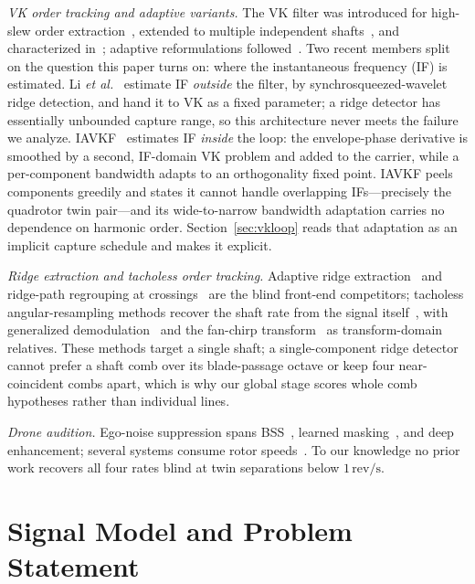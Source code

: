 \documentclass[journal]{IEEEtran}
\newcommand{\revps}{\ensuremath{\,\mathrm{rev/s}}}
\begin{document}
\emph{VK order tracking and adaptive variants.} The VK filter was
introduced for high-slew order extraction~\cite{vold1993high}, extended to
multiple independent shafts~\cite{vold1997multi}, and characterized
in~\cite{herlufsen1999characteristics,tuma2000characteristics}; adaptive
reformulations followed~\cite{pan2007adaptive,pan2010extended}. Two recent
members split on the question this paper turns on: where the instantaneous
frequency (IF) is estimated. Li \emph{et al.}~\cite{li2020vkswt} estimate
IF \emph{outside} the filter, by synchrosqueezed-wavelet ridge detection,
and hand it to VK as a fixed parameter; a ridge detector has essentially
unbounded capture range, so this architecture never meets the failure we
analyze. IAVKF~\cite{jiang2024iavkf} estimates IF \emph{inside} the loop:
the envelope-phase derivative is smoothed by a second, IF-domain VK
problem and added to the carrier, while a per-component bandwidth adapts
to an orthogonality fixed point. IAVKF peels components greedily and
states it cannot handle overlapping IFs---precisely the quadrotor twin
pair---and its wide-to-narrow bandwidth adaptation carries no dependence
on harmonic order. Section~\ref{sec:vkloop} reads that adaptation as an
implicit capture schedule and makes it explicit.

\emph{Ridge extraction and tacholess order tracking.} Adaptive ridge
extraction~\cite{iatsenko2016ridges,aare2023ridge} and ridge-path
regrouping at crossings~\cite{chen2017rprg} are the blind front-end
competitors; tacholess angular-resampling methods recover the shaft rate
from the signal itself~\cite{peeters2019tacholess,wang2019tlot}, with
generalized demodulation~\cite{olhede2005generalized} and the fan-chirp
transform~\cite{weruaga2007fanchirp} as transform-domain relatives. These
methods target a single shaft; a single-component ridge detector cannot
prefer a shaft comb over its blade-passage octave or keep four
near-coincident combs apart, which is why our global stage scores whole
comb hypotheses rather than individual lines.

\emph{Drone audition.} Ego-noise suppression spans
BSS~\cite{wang2020bss}, learned masking~\cite{wang2020dnntf}, and deep
enhancement; several systems consume rotor
speeds~\cite{yen2023ncm,gulli2025rotorcond}. To our knowledge no prior
work recovers all four rates blind at twin separations below $1\revps$.

\section{Signal Model and Problem Statement}
\label{sec:model}
\end{document}
